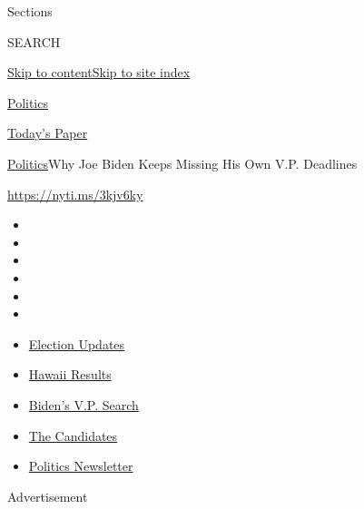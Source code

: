 Sections

SEARCH

\protect\hyperlink{site-content}{Skip to
content}\protect\hyperlink{site-index}{Skip to site index}

\href{https://www.nytimes.com/section/politics}{Politics}

\href{https://myaccount.nytimes.com/auth/login?response_type=cookie\&client_id=vi}{}

\href{https://www.nytimes.com/section/todayspaper}{Today's Paper}

\href{/section/politics}{Politics}\textbar{}Why Joe Biden Keeps Missing
His Own V.P. Deadlines

\href{https://nyti.ms/3kjv6ky}{https://nyti.ms/3kjv6ky}

\begin{itemize}
\item
\item
\item
\item
\item
\item
\end{itemize}

\begin{itemize}
\item
  \href{https://www.nytimes.com/2020/08/07/us/elections/biden-vs-trump.html?action=click\&pgtype=Article\&state=default\&region=TOP_BANNER\&context=storylines_menu}{Election
  Updates}
\item
  \href{https://www.nytimes.com/interactive/2020/08/08/us/elections/results-hawaii-primary-elections.html?action=click\&pgtype=Article\&state=default\&region=TOP_BANNER\&context=storylines_menu}{Hawaii
  Results}
\item
  \href{https://www.nytimes.com/article/biden-vice-president-2020.html?action=click\&pgtype=Article\&state=default\&region=TOP_BANNER\&context=storylines_menu}{Biden's
  V.P. Search}
\item
  \href{https://www.nytimes.com/interactive/2019/us/politics/2020-presidential-candidates.html?action=click\&pgtype=Article\&state=default\&region=TOP_BANNER\&context=storylines_menu}{The
  Candidates}
\item
  \href{https://www.nytimes.com/newsletters/politics?action=click\&pgtype=Article\&state=default\&region=TOP_BANNER\&context=storylines_menu}{Politics
  Newsletter}
\end{itemize}

Advertisement


